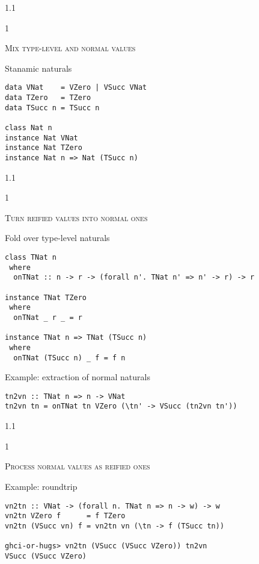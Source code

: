 \documentclass{slides}
\newcommand{\header}[1]{{\large\scshape \color{Red} #1} \medskip }
\newcommand{\blau}[1]{{\color{Blue} #1} \medskip }
\newenvironment{myslide}{\begin{slide}\color{Blue}\begin{boxedminipage}{1.1\hsize}\begin{boxedminipage}{1\hsize}\color{Black}
\vspace{-170\in}
}{%
\smallskip
\end{boxedminipage}
\end{boxedminipage}
\end{slide}}
\begin{document}



\begin{myslide}

\header{Mix type-level and normal values}

\blau{Stanamic naturals}

\begin{Verbatim}[fontseries=normal,fontsize=\small]
data VNat    = VZero | VSucc VNat
data TZero   = TZero
data TSucc n = TSucc n

class Nat n
instance Nat VNat
instance Nat TZero
instance Nat n => Nat (TSucc n)
\end{Verbatim}

\end{myslide}






\begin{myslide}

\header{Turn reified values into normal ones}

\blau{Fold over type-level naturals}

\begin{Verbatim}[fontseries=normal,fontsize=\tiny]
class TNat n
 where
  onTNat :: n -> r -> (forall n'. TNat n' => n' -> r) -> r
  
instance TNat TZero
 where
  onTNat _ r _ = r

instance TNat n => TNat (TSucc n)
 where
  onTNat (TSucc n) _ f = f n
\end{Verbatim}

\medskip

\blau{Example: extraction of normal naturals}

\begin{Verbatim}[fontseries=normal,fontsize=\tiny]
tn2vn :: TNat n => n -> VNat
tn2vn tn = onTNat tn VZero (\tn' -> VSucc (tn2vn tn'))
\end{Verbatim}

\end{myslide}






\begin{myslide}

\header{Process normal values as reified ones}

\blau{Example: roundtrip}

\begin{Verbatim}[fontseries=normal,fontsize=\tiny]
vn2tn :: VNat -> (forall n. TNat n => n -> w) -> w
vn2tn VZero f      = f TZero
vn2tn (VSucc vn) f = vn2tn vn (\tn -> f (TSucc tn))

ghci-or-hugs> vn2tn (VSucc (VSucc VZero)) tn2vn
VSucc (VSucc VZero)
\end{Verbatim}

\end{myslide}
\end{document}

